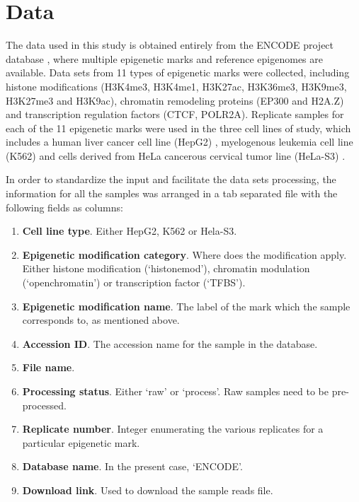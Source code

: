 \section{Data}

The data used in this study is obtained entirely from the ENCODE project database \cite{Feingold2004}, where multiple epigenetic marks and reference epigenomes are available. Data sets from 11 types of epigenetic marks were collected, including histone modifications (H3K4me3, H3K4me1, H3K27ac, H3K36me3, H3K9me3, H3K27me3 and H3K9ac), chromatin remodeling proteins (EP300 and H2A.Z) and transcription regulation factors (CTCF, POLR2A). Replicate samples for each of the 11 epigenetic marks were used in the three cell lines of study, which includes a human liver cancer cell line (HepG2) \cite{Aden1979}, myelogenous leukemia cell line (K562) \cite{Andersson1979} and cells derived from HeLa cancerous cervical tumor line (HeLa-S3) \cite{Douglas1973,Chen2008}.

\medskip

In order to standardize the input and facilitate the data sets processing, the information for all the samples was arranged in a tab separated file with the following fields as columns:

\begin{enumerate}
    \item \textbf{Cell line type}. Either HepG2, K562 or Hela-S3.
    \item \textbf{Epigenetic modification category}. Where does the modification apply. Either histone modification (`histonemod'), chromatin modulation (`openchromatin') or transcription factor (`TFBS').
    \item \textbf{Epigenetic modification name}. The label of the mark which the sample corresponds to, as mentioned above.
    \item \textbf{Accession ID}. The accession name for the sample in the database.
    \item \textbf{File name}.
    \item \textbf{Processing status}. Either `raw' or `process'. Raw samples need to be pre-processed.
    \item \textbf{Replicate number}. Integer enumerating the various replicates for a particular epigenetic mark.
    \item \textbf{Database name}. In the present case, `ENCODE'.
    \item \textbf{Download link}. Used to download the sample reads file.
\end{enumerate}

